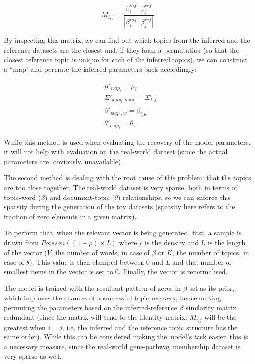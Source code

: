 \documentclass[12pt,a4paper,twoside,openright]{report}
\begin{document}
\begin{equation}\label{eq:beta_similarity matrix}
M_{i,j} = \frac{\beta^{inf}_i \cdot \beta^{ref}_j}{|\beta^{inf}_i||\beta^{ref}_j|}
\end{equation}

By inspecting this matrix, we can find out which topics from the inferred and the reference datasets are the closest and, if they form a permutation (so that the closest reference topic is unique for each of the inferred topics), we can construct a ``map" and permute the inferred parameters back accordingly:

\begin{align*}
&\mu'_{map_i} = \mu_i \\
&\Sigma'_{map_i, map_j} = \Sigma_{i, j} \\
&\beta'_{map_i, w} = \beta_{i, w} \\
&\theta'_{map_i} = \theta_i
\end{align*}

While this method is used when evaluating the recovery of the model parameters, it will not help with evaluation on the real-world dataset (since the actual parameters are, obviously, unavailable).

The second method is dealing with the root cause of this problem: that the topics are too close together. The real-world dataset is very sparse, both in terms of topic-word ($\beta$) and document-topic ($\theta$) relationships, so we can enforce this sparsity during the generation of the toy datasets (sparsity here refers to the fraction of zero elements in a given matrix).

To perform that, when the relevant vector is being generated, first, a sample is drawn from $\mathit{Poisson}((1-\rho) \times L)$ where $\rho$ is the density and $L$ is the length of the vector ($V$, the number of words, in case of $\beta$ or $K$, the number of topics, in case of $\theta$). This value is then clamped between 0 and $L$ and that number of smallest items in the vector is set to 0. Finally, the vector is renormalised.

The model is trained with the resultant pattern of zeros in $\beta$ set as its prior, which improves the chances of a successful topic recovery, hence making permuting the parameters based on the inferred-reference $\beta$ similarity matrix redundant (since the matrix will tend to the identity matrix: $M_{i, j}$ will be the greatest when $i = j$, i.e. the inferred and the reference topic structure has the same order). While this can be considered making the model's task easier, this is a necessary measure, since the real-world gene-pathway membership dataset is very sparse as well.
\end{document}
